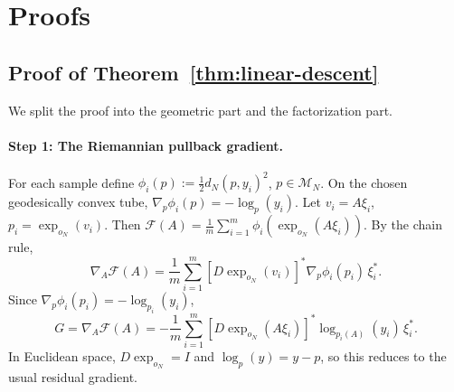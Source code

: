 \documentclass[letterpaper]{article}
\begin{document}



\onecolumn
\appendix

\section{Proofs}
\label{sec:proofs}

\subsection{Proof of Theorem~\ref{thm:linear-descent}}
\label{sec:proof-linear-descent}

We split the proof into the geometric part and the factorization part.

\paragraph{Step 1: The Riemannian pullback gradient.}
For each sample define \(\phi_i(p):=\frac12 d_N(p,y_i)^2\),
\(p\in \mathcal M_N\). On the chosen geodesically convex tube,
\(\nabla_p \phi_i(p) = -\log_p(y_i)\). Let \(v_i=A\xi_i\),
\(p_i=\exp_{o_N}(v_i)\). Then
\(\mathcal F(A) = \frac1m\sum_{i=1}^m \phi_i(\exp_{o_N}(A\xi_i))\).
By the chain rule,
\[
\nabla_A\mathcal F(A)
=
\frac1m\sum_{i=1}^m
\left[D\exp_{o_N}(v_i)\right]^* \nabla_p\phi_i(p_i) \,\xi_i^*.
\]
Since \(\nabla_p\phi_i(p_i)=-\log_{p_i}(y_i)\),
\begin{equation}
\label{eq:pullback-gradient}
G
=
\nabla_A\mathcal F(A)
=
-\frac1m\sum_{i=1}^m
\left[D\exp_{o_N}(A\xi_i)\right]^* \log_{p_i(A)}(y_i) \,\xi_i^*.
\end{equation}
In Euclidean space, \(D\exp_{o_N}=I\) and \(\log_p(y)=y-p\), so this
reduces to the usual residual gradient.
\end{document}

